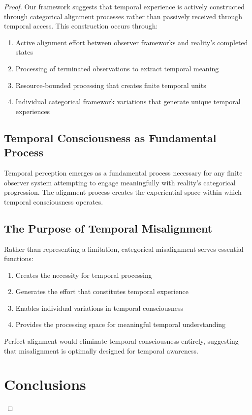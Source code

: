 \documentclass[12pt,a4paper]{article}
\begin{document}
\begin{proof}
Our framework suggests that temporal experience is actively constructed through categorical alignment processes rather than passively received through temporal access. This construction occurs through:

\begin{enumerate}
\item Active alignment effort between observer frameworks and reality's completed states
\item Processing of terminated observations to extract temporal meaning
\item Resource-bounded processing that creates finite temporal units
\item Individual categorical framework variations that generate unique temporal experiences
\end{enumerate}

\subsection{Temporal Consciousness as Fundamental Process}

Temporal perception emerges as a fundamental process necessary for any finite observer system attempting to engage meaningfully with reality's categorical progression. The alignment process creates the experiential space within which temporal consciousness operates.

\subsection{The Purpose of Temporal Misalignment}

Rather than representing a limitation, categorical misalignment serves essential functions:

\begin{enumerate}
\item Creates the necessity for temporal processing
\item Generates the effort that constitutes temporal experience
\item Enables individual variations in temporal consciousness
\item Provides the processing space for meaningful temporal understanding
\end{enumerate}

Perfect alignment would eliminate temporal consciousness entirely, suggesting that misalignment is optimally designed for temporal awareness.

\section{Conclusions}


\end{proof}
\end{document}
